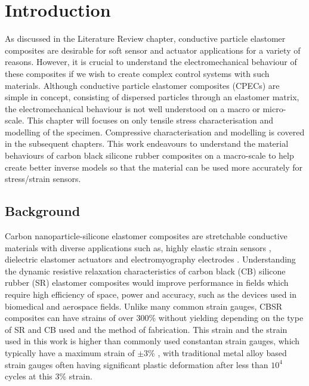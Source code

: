 \section{Introduction}
\label{sec:ch3-intro}
As discussed in the Literature Review chapter, conductive particle elastomer composites are desirable for soft sensor and actuator applications for a variety of reasons. However, it is crucial to understand the electromechanical behaviour of these composites if we wish to create complex control systems with such materials. Although conductive particle elastomer composites (CPECs) are simple in concept, consisting of dispersed particles through an elastomer matrix, the electromechanical behaviour is not well understood on a macro or micro-scale. This chapter will focuses on only tensile stress characterisation and modelling of the specimen. Compressive characterisation and modelling is covered in the subsequent chapters. This work endeavours to understand the material behaviours of carbon black silicone rubber composites on a macro-scale to help create better inverse models so that the material can be used more accurately for stress/strain sensors. 


\subsection{Background}
Carbon nanoparticle-silicone elastomer composites are stretchable conductive materials with diverse applications such as, highly elastic strain sensors \cite{Lacasse2010,Spahr2017,Kim2018}, dielectric elastomer actuators \cite{Henke2018,Liu2009} and electromyography electrodes \cite{Carpi2010,Kim2018,Mouri2019}. Understanding the dynamic resistive relaxation characteristics of carbon black (CB) silicone rubber (SR) elastomer composites would improve performance in fields which require high efficiency of space, power and accuracy, such as the devices used in biomedical and aerospace fields. Unlike many common strain gauges, CBSR composites can have strains of over 300\% without yielding \cite{Wang2010} depending on the type of SR and CB used and the method of fabrication. This strain and the strain used in this work is higher than commonly used constantan strain gauges, which typically have a maximum strain of $\pm 3$\% \cite{VishayPG2018}, with traditional metal alloy based strain gauges often having significant plastic deformation after less than $10^4$ cycles \cite{VishayPG2018} at this 3\% strain.


